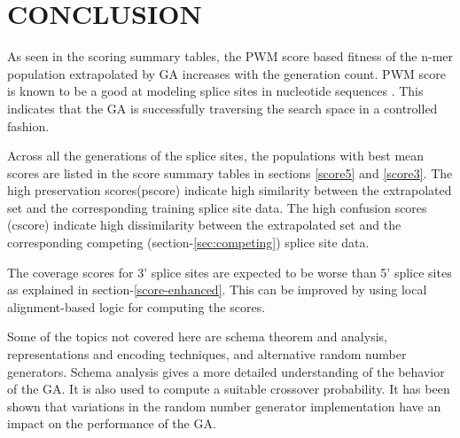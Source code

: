 \documentclass[12pt,a4paper]{article}
\begin{document}
	\section{CONCLUSION}
	As seen in the scoring summary tables, the PWM score based fitness of the n-mer population extrapolated by GA increases with the generation count. PWM score is known to be a good at modeling splice sites in nucleotide sequences \cite{pwm-2}. This indicates that the GA is successfully traversing the search space in a controlled fashion. \par
	Across all the generations of the splice sites, the populations with best mean scores are listed in the score summary tables in sections \ref{score5} and \ref{score3}. The high preservation scores(pscore) indicate high similarity between the extrapolated set and the corresponding training splice site data. The high confusion scores (cscore) indicate high dissimilarity between the extrapolated set and the corresponding competing (section-\ref{sec:competing}) splice site data. \par
	The coverage scores for 3' splice sites are expected to be worse than 5' splice sites as explained in section-\ref{score-enhanced}. This can be improved by using local alignment-based logic for computing the scores. \par
	Some of the topics not covered here are schema theorem and analysis, representations and encoding techniques, and alternative random number generators. Schema analysis gives a more detailed understanding of the behavior of the GA. It is also used to compute a suitable crossover probability. It has been shown that variations in the random number generator implementation have an impact on the performance of the GA. 
	
\end{document}
